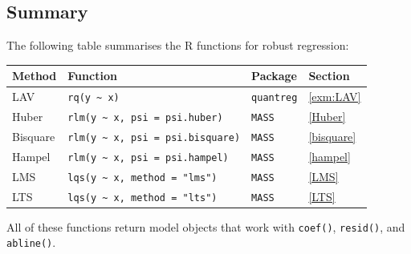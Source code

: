 \documentclass[
  a4paper,
]{article}
\theoremstyle{definition}
\theoremstyle{definition}
\theoremstyle{definition}
\theoremstyle{definition}
\theoremstyle{remark}
\begin{document}
\subsection*{Summary}\label{summary}

The following table summarises the R functions for robust regression:

{\def\LTcaptype{} %
\begin{longtable}[]{@{}
  >{\raggedright\arraybackslash}p{}
  >{\raggedright\arraybackslash}p{}
  >{\raggedright\arraybackslash}p{}
  >{\raggedright\arraybackslash}p{}@{}}
\toprule\noalign{}
\begin{minipage}[b]{\linewidth}\raggedright
Method
\end{minipage} & \begin{minipage}[b]{\linewidth}\raggedright
Function
\end{minipage} & \begin{minipage}[b]{\linewidth}\raggedright
Package
\end{minipage} & \begin{minipage}[b]{\linewidth}\raggedright
Section
\end{minipage} \\
\midrule\noalign{}
\endhead
\bottomrule\noalign{}
\endlastfoot
LAV & \texttt{rq(y\ \textasciitilde{}\ x)} & \texttt{quantreg} & \ref{exm:LAV} \\
Huber & \texttt{rlm(y\ \textasciitilde{}\ x,\ psi\ =\ psi.huber)} & \texttt{MASS} & \ref{Huber} \\
Bisquare & \texttt{rlm(y\ \textasciitilde{}\ x,\ psi\ =\ psi.bisquare)} & \texttt{MASS} & \ref{bisquare} \\
Hampel & \texttt{rlm(y\ \textasciitilde{}\ x,\ psi\ =\ psi.hampel)} & \texttt{MASS} & \ref{hampel} \\
LMS & \texttt{lqs(y\ \textasciitilde{}\ x,\ method\ =\ "lms")} & \texttt{MASS} & \ref{LMS} \\
LTS & \texttt{lqs(y\ \textasciitilde{}\ x,\ method\ =\ "lts")} & \texttt{MASS} & \ref{LTS} \\
\end{longtable}
}

All of these functions return model objects that work with \texttt{coef()}, \texttt{resid()},
and \texttt{abline()}.
\end{document}
